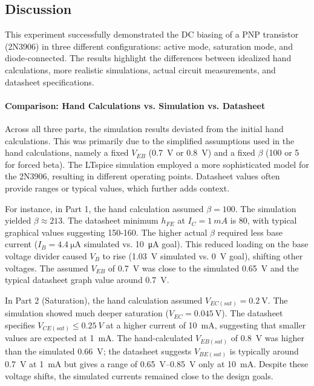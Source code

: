 \documentclass[12pt]{article}
\begin{document}
\clearpage

\subsection{Discussion}
This experiment successfully demonstrated the DC biasing of a PNP transistor (2N3906) in three different configurations: active mode, saturation mode, and diode-connected. The results highlight the differences between idealized hand calculations, more realistic simulations, actual circuit measurements, and datasheet specifications.

\paragraph{Comparison: Hand Calculations vs. Simulation vs. Datasheet}
Across all three parts, the simulation results deviated from the initial hand calculations. This was primarily due to the simplified assumptions used in the hand calculations, namely a fixed $V_{EB}$ (\SI{0.7}{\volt} or \SI{0.8}{\volt}) and a fixed $\beta$ (100 or 5 for forced beta). The LTspice simulation employed a more sophisticated model for the 2N3906, resulting in different operating points. Datasheet values often provide ranges or typical values, which further adds context.

For instance, in Part 1, the hand calculation assumed $\beta=100$. The simulation yielded $\beta \approx 213$. The datasheet minimum $h_{FE}$ at $I_C = \SI{1}{mA}$ is 80, with typical graphical values suggesting 150-160. The higher actual $\beta$ required less base current ($I_B = \SI{4.4}{\micro\ampere}$ simulated vs. \SI{10}{\micro\ampere} goal). This reduced loading on the base voltage divider caused $V_B$ to rise (\SI{1.03}{\volt} simulated vs. \SI{0}{\volt} goal), shifting other voltages. The assumed $V_{EB}$ of \SI{0.7}{\volt} was close to the simulated \SI{0.65}{\volt} and the typical datasheet graph value around \SI{0.7}{\volt}.

In Part 2 (Saturation), the hand calculation assumed $V_{EC(sat)} = \SI{0.2}{\volt}$. The simulation showed much deeper saturation ($V_{EC} = \SI{0.045}{\volt}$). The datasheet specifies $V_{CE(sat)} \le \SI{0.25}{V}$ at a higher current of \SI{10}{mA}, suggesting that smaller values are expected at \SI{1}{mA}. The hand-calculated $V_{EB(sat)}$ of \SI{0.8}{\volt} was higher than the simulated \SI{0.66}{\volt}; the datasheet suggests $V_{BE(sat)}$ is typically around \SI{0.7}{\volt} at \SI{1}{mA} but gives a range of \SIrange{0.65}{0.85}{V} only at \SI{10}{mA}. Despite these voltage shifts, the simulated currents remained close to the design goals.
\end{document}
